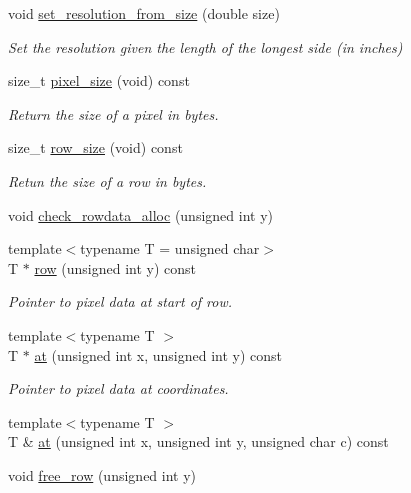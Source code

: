 \begin{DoxyCompactItemize}
void \hyperlink{class_photo_finish_1_1_image_a4775db7132f11396138ea6a35301e896}{set\+\_\+resolution\+\_\+from\+\_\+size} (double size)
\begin{DoxyCompactList}\small\item\em Set the resolution given the length of the longest side (in inches) \end{DoxyCompactList}\item 
size\+\_\+t \hyperlink{class_photo_finish_1_1_image_a0671615066506ceed7419e67e31a0db1}{pixel\+\_\+size} (void) const
\begin{DoxyCompactList}\small\item\em Return the size of a pixel in bytes. \end{DoxyCompactList}\item 
size\+\_\+t \hyperlink{class_photo_finish_1_1_image_aafdcf1eb872ae541275364205ee8afc2}{row\+\_\+size} (void) const
\begin{DoxyCompactList}\small\item\em Retun the size of a row in bytes. \end{DoxyCompactList}\item 
void \hyperlink{class_photo_finish_1_1_image_a9e21d2c5b2d5615a335ea1f36e49aa2f}{check\+\_\+rowdata\+\_\+alloc} (unsigned int y)
\item 
{\footnotesize template$<$typename T  = unsigned char$>$ }\\T $\ast$ \hyperlink{class_photo_finish_1_1_image_af6b5f6b2039847b7501d8a69064eb248}{row} (unsigned int y) const
\begin{DoxyCompactList}\small\item\em Pointer to pixel data at start of row. \end{DoxyCompactList}\item 
{\footnotesize template$<$typename T $>$ }\\T $\ast$ \hyperlink{class_photo_finish_1_1_image_a3c37b36b0de68de2d1f3dac005c9bc44}{at} (unsigned int x, unsigned int y) const
\begin{DoxyCompactList}\small\item\em Pointer to pixel data at coordinates. \end{DoxyCompactList}\item 
{\footnotesize template$<$typename T $>$ }\\T \& \hyperlink{class_photo_finish_1_1_image_a5317fe76e44a998b01160ebfe1fa6f05}{at} (unsigned int x, unsigned int y, unsigned char c) const
\item 
void \hyperlink{class_photo_finish_1_1_image_a9dfe18a5ebeca8e9ddd66e71608d3ba6}{free\+\_\+row} (unsigned int y)

\end{DoxyCompactItemize}
